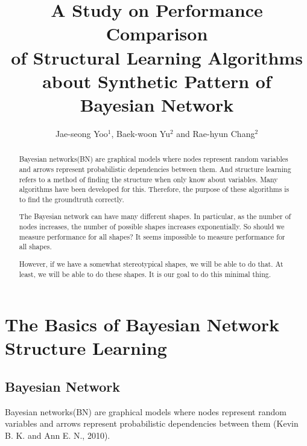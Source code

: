 \documentclass[runningheads,a4paper]{llncs}
\begin{document}
\mainmatter  %

\title{A Study on Performance Comparison \\ of Structural Learning Algorithms \\ about Synthetic Pattern of Bayesian Network}

\author{Jae-seong Yoo$^{1}$, Baek-woon Yu$^{2}$ and Rae-hyun Chang$^{2}$}


\maketitle

\begin{abstract}
Bayesian networks(BN) are graphical models where nodes represent random variables and arrows represent probabilistic dependencies between them. And structure learning refers to a method of finding the structure when only know about variables. Many algorithms have been developed for this. Therefore, the purpose of these algorithms is to find the groundtruth correctly.

The Bayesian network can have many different shapes. In particular, as the number of nodes increases, the number of possible shapes increases exponentially. So should we measure performance for all shapes? It seems impossible to measure performance for all shapes.

However, if we have a somewhat stereotypical shapes, we will be able to do that. At least, we will be able to do these shapes. It is our goal to do this minimal thing.
\end{abstract}




\section{The Basics of Bayesian Network Structure Learning}

\subsection{Bayesian Network}
	
Bayesian networks(BN) are graphical models where nodes represent random variables and arrows represent probabilistic dependencies between them {\scriptsize{}(Kevin B. K. and Ann E. N., 2010)}.
\end{document}
